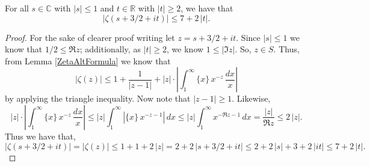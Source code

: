 \begin{theorem}[GlobalBound]
\label{GlobalBound}
\leanok
For all $s\in\mathbb{C}$ with $|s|\leq 1$ and $t\in\mathbb{R}$ with $|t|\geq 2$, we have that
    $$|\zeta(s+3/2+it)|\leq 7+2\,|t|.$$
\end{theorem}
\begin{proof}
\leanok
For the sake of clearer proof writing let $z=s+3/2+it$. Since $|s|\leq 1$ we know that
    $1/2\leq\mathfrak{R}z$; additionally, as $|t|\geq 2$, we know $1\leq|\mathfrak{I}z|$.
    So, $z\in S$. Thus, from Lemma \ref{ZetaAltFormula} we know that
    $$|\zeta(z)|\leq 1+\frac{1}{|z-1|}
      +|z|\cdot\left|\int_1^\infty\{x\}\,x^{-z}\,\frac{dx}{x}\right|$$
    by applying the triangle inequality. Now note that $|z-1|\geq 1$. Likewise,
    $$|z|\cdot\left|\int_1^\infty\{x\}\,x^{-z}\,\frac{dx}{x}\right|
      \leq|z|\int_1^\infty|\{x\}\,x^{-z-1}|\,dx
      \leq|z|\int_1^\infty x^{-\Re z-1}\,dx=\frac{|z|}{\Re z}\leq 2\,|z|.$$
    Thus we have that,
    $$|\zeta(s+3/2+it)|=|\zeta(z)|\leq 1+1+2\,|z|=2+2\,|s+3/2+it|
      \leq2+2\,|s|+3+2\,|it|\leq 7+2\,|t|.$$
\end{proof}
